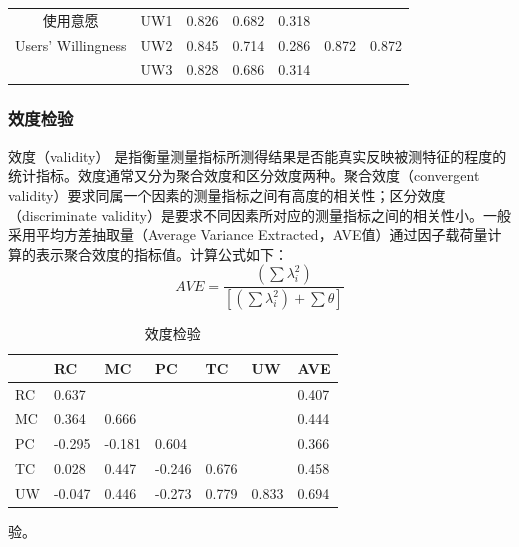 \documentclass[12pt,UTF8]{ctexart}
\begin{document}
\begin{spacing}{1.25}
\begin{table}[H]
\begin{tabular}{@{}ccccccc@{}}
使用意愿        & UW1           & 0.826                                                                & 0.682                                                                 & 0.318                                                                    &                        &                              \\
Users' Willingness          & UW2           & 0.845                                                                & 0.714                                                                 & 0.286                                                                    & 0.872                  & 0.872                        \\
            & UW3           & 0.828                                                                & 0.686                                                                 & 0.314                                                                    &                        &                              \\ \bottomrule
\end{tabular}
\end{table}
\subsubsection{效度检验}
效度（validity） 是指衡量测量指标所测得结果是否能真实反映被测特征的程度的统计指标。效度通常又分为聚合效度和区分效度两种。聚合效度（convergent validity）要求同属一个因素的测量指标之间有高度的相关性；区分效度（discriminate validity）是要求不同因素所对应的测量指标之间的相关性小。一般采用平均方差抽取量（Average Variance Extracted，AVE值）通过因子载荷量计算的表示聚合效度的指标值。计算公式如下：
\begin{equation}
    AVE=\frac{\left (  \sum \lambda _{i}^{2}\right )}{\left [\left (  \sum \lambda _{i}^{2}\right )+\sum \theta   \right ]}
\end{equation}

\begin{table}[H]
\centering
\caption{效度检验}
\label{tab:val}
\begin{tabular}{@{}lllllll@{}}
\toprule
\textbf{} & \textbf{RC} & \textbf{MC} & \textbf{PC} & \textbf{TC} & \textbf{UW} & \textbf{AVE} \\ \midrule
RC        & 0.637       &             &             &             &             & 0.407        \\
MC        & 0.364       & 0.666       &             &             &             & 0.444        \\
PC        & -0.295      & -0.181      & 0.604       &             &             & 0.366        \\
TC        & 0.028       & 0.447       & -0.246      & 0.676       &             & 0.458        \\
UW        & -0.047      & 0.446       & -0.273      & 0.779       & 0.833       & 0.694        \\ \bottomrule
\end{tabular}
\end{table}
验。

\end{spacing}
\end{document}
